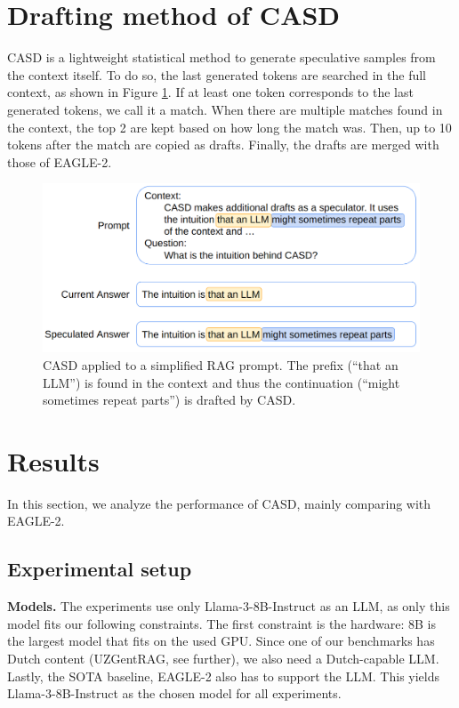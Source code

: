 \section{Drafting method of CASD}
CASD is a lightweight statistical method to generate speculative samples from the context itself. To do so, the last generated tokens are searched in the full context, as shown in Figure \ref{fig:CASD_example_prompt}. If at least one token corresponds to the last generated tokens, we call it a match. When there are multiple matches found in the context, the top 2 are kept based on how long the match was. Then, up to 10 tokens after the match are copied as drafts. Finally, the drafts are merged with those of EAGLE-2.

\begin{figure}[h]
	\centering
	\includegraphics[width=0.7\linewidth]{fig/CASD_example_prompt.png}
	\caption{CASD applied to a simplified RAG prompt. The \textcolor{orange-ish}{prefix} (``that an LLM'') is found in the context and thus the \textcolor{blue-ish}{continuation} (``might sometimes repeat parts'') is drafted by CASD.}
	\label{fig:CASD_example_prompt}
\end{figure}

\section{Results}
In this section, we analyze the performance of CASD, mainly comparing with EAGLE-2.

\subsection{Experimental setup}
\textbf{Models.} The experiments use only Llama-3-8B-Instruct \cite{grattafiori2024llama} as an LLM, as only this model fits our following constraints. The first constraint is the hardware: 8B is the largest model that fits on the used GPU. Since one of our benchmarks has Dutch content (UZGentRAG, see further), we also need a Dutch-capable LLM. Lastly, the SOTA baseline, EAGLE-2 also has to support the LLM. This yields Llama-3-8B-Instruct as the chosen model for all experiments. 

